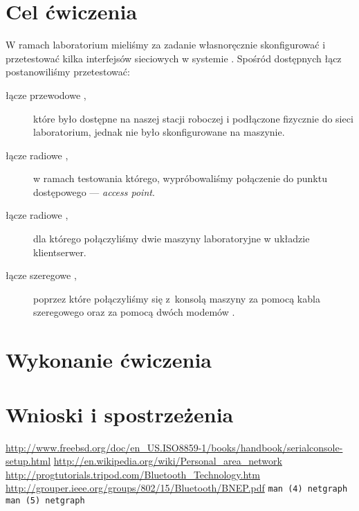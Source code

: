 \documentclass[a4paper,11pt,notitlepage]{article}
\begin{document}

\maketitle
\tableofcontents


\section{Cel ćwiczenia}

W ramach laboratorium mieliśmy za zadanie własnoręcznie skonfigurować i
przetestować kilka interfejsów sieciowych w systemie \bsd. Spośród dostępnych
łącz postanowiliśmy przetestować:

\begin{description}
    \item[łącze przewodowe \eth\textnormal{,}] które było dostępne na naszej
    stacji roboczej i podłączone fizycznie do sieci laboratorium, jednak nie
    było skonfigurowane na maszynie.
    \item[łącze radiowe \wifi\textnormal{,}] w ramach testowania którego,
    wypróbowaliśmy połączenie do punktu dostępowego --- \emph{access point}.
    \item[łącze radiowe \bt\textnormal{,}] dla którego połączyliśmy dwie
    maszyny laboratoryjne w układzie klient\dywiz serwer.
    \item[łącze szeregowe \rs\textnormal{,}] poprzez które połączyliśmy się
    z~konsolą maszyny \zielone{} za pomocą kabla szeregowego oraz za pomocą
    dwóch modemów \bt.
\end{description}


\section{Wykonanie ćwiczenia}







\section{Wnioski i spostrzeżenia}


\begin{thebibliography}{9}
        \url{http://www.freebsd.org/doc/en_US.ISO8859-1/books/handbook/serialconsole-setup.html}
        \url{http://en.wikipedia.org/wiki/Personal_area_network}
        \url{http://progtutorials.tripod.com/Bluetooth_Technology.htm}
        \url{http://grouper.ieee.org/groups/802/15/Bluetooth/BNEP.pdf}
        {\texttt{man (4) netgraph}}
        {\texttt{man (5) netgraph}}
\end{thebibliography}
\end{document}
